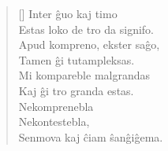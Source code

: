 \begin{verse}[\textwidth]
    Inter ĝuo kaj timo\\
    Estas loko de tro da signifo.\\
    Apud kompreno, ekster saĝo,\\
    Tamen ĝi tutampleksas.\\
    Mi kompareble malgrandas\\
    Kaj ĝi tro granda estas.\\
    Nekomprenebla\\
    Nekontestebla,\\
    Senmova kaj ĉiam ŝanĝiĝema.
\end{verse}
